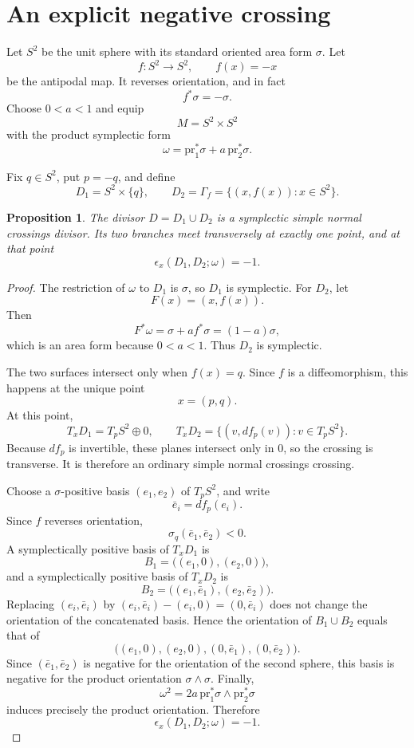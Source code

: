 \documentclass[11pt]{article}
\newtheorem{proposition}[theorem]{Proposition}
\theoremstyle{definition}
\theoremstyle{remark}
\newcommand{\pr}{\mathrm{pr}}
\begin{document}
\section{An explicit negative crossing}

Let $S^2$ be the unit sphere with its standard oriented area form $\sigma$.
Let
\[
f\colon S^2\longrightarrow S^2,\qquad f(x)=-x
\]
be the antipodal map. It reverses orientation, and in fact
\[
f^*\sigma=-\sigma.
\]
Choose $0<a<1$ and equip
\[
M=S^2\times S^2
\]
with the product symplectic form
\[
\omega=\pr_1^*\sigma+a\,\pr_2^*\sigma.
\]

Fix $q\in S^2$, put $p=-q$, and define
\[
D_1=S^2\times\{q\},
\qquad
D_2=\Gamma_f=\{(x,f(x)):x\in S^2\}.
\]

\begin{proposition}\label{prop:example}
The divisor $D=D_1\cup D_2$ is a symplectic simple normal crossings divisor.
Its two branches meet transversely at exactly one point, and at that point
\[
\epsilon_x(D_1,D_2;\omega)=-1.
\]
\end{proposition}

\begin{proof}
The restriction of $\omega$ to $D_1$ is $\sigma$, so $D_1$ is symplectic.
For $D_2$, let
\[
F(x)=(x,f(x)).
\]
Then
\[
F^*\omega=\sigma+a f^*\sigma=(1-a)\sigma,
\]
which is an area form because $0<a<1$. Thus $D_2$ is symplectic.

The two surfaces intersect only when $f(x)=q$. Since $f$ is a diffeomorphism,
this happens at the unique point
\[
x=(p,q).
\]
At this point,
\[
T_xD_1=T_pS^2\oplus 0,
\qquad
T_xD_2=\{(v,df_p(v)):v\in T_pS^2\}.
\]
Because $df_p$ is invertible, these planes intersect only in $0$, so the
crossing is transverse. It is therefore an ordinary simple normal crossings
crossing.

Choose a $\sigma$-positive basis $(e_1,e_2)$ of $T_pS^2$, and write
\[
\bar e_i=df_p(e_i).
\]
Since $f$ reverses orientation,
\[
\sigma_q(\bar e_1,\bar e_2)<0.
\]
A symplectically positive basis of $T_xD_1$ is
\[
B_1=\bigl((e_1,0),(e_2,0)\bigr),
\]
and a symplectically positive basis of $T_xD_2$ is
\[
B_2=\bigl((e_1,\bar e_1),(e_2,\bar e_2)\bigr).
\]
Replacing $(e_i,\bar e_i)$ by $(e_i,\bar e_i)-(e_i,0)=(0,\bar e_i)$ does not
change the orientation of the concatenated basis. Hence the orientation of
$B_1\cup B_2$ equals that of
\[
\bigl((e_1,0),(e_2,0),(0,\bar e_1),(0,\bar e_2)\bigr).
\]
Since $(\bar e_1,\bar e_2)$ is negative for the orientation of the second
sphere, this basis is negative for the product orientation
$\sigma\wedge\sigma$. Finally,
\[
\omega^2=2a\,\pr_1^*\sigma\wedge\pr_2^*\sigma
\]
induces precisely the product orientation. Therefore
\[
\epsilon_x(D_1,D_2;\omega)=-1.
\]
\end{proof}
\end{document}
